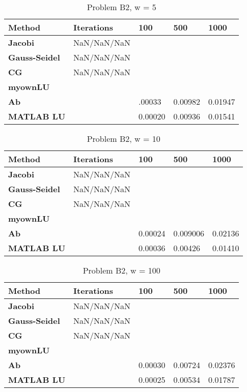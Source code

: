 \documentclass[a4paper]{article}
\begin{document}
\begin{table}[ht!]
\centering
\begin{tabular}{lllll}
\textbf{Method}& \textbf{Iterations}& \textbf{100}& \textbf{500}& \textbf{1000} \\ \hline
\textbf{Jacobi}& NaN/NaN/NaN& & & \\ 
\textbf{Gauss-Seidel}& NaN/NaN/NaN& & & \\
\textbf{CG}& NaN/NaN/NaN& & & \\
\textbf{myownLU}& & & & \\ 
\textbf{Ab}& & .00033& 0.00982& 0.01947\\
\textbf{MATLAB LU}& & 0.00020& 0.00936& 0.01541\\
 \hline

\end{tabular}
\caption{Problem B2, w = 5}
\label{tab:tab2}
\end{table}

\newpage
\begin{table}[ht!]
\centering
\begin{tabular}{lllll}
\textbf{Method}& \textbf{Iterations}& \textbf{100}& \textbf{500}& \textbf{1000} \\ \hline
\textbf{Jacobi}& NaN/NaN/NaN& & & \\ 
\textbf{Gauss-Seidel}& NaN/NaN/NaN& & & \\
\textbf{CG} & NaN/NaN/NaN& & &  \\
\textbf{myownLU}& & & & \\ 
\textbf{Ab}& & 0.00024& 0.009006& 0.02136\\
\textbf{MATLAB LU}& & 0.00036& 0.00426& 0.01410 \\
 \hline

\end{tabular}
\caption{Problem B2, w = 10}
\label{tab:tab3}
\end{table}


\begin{table}[ht!]
\centering
\begin{tabular}{lllll}
\textbf{Method}& \textbf{Iterations}& \textbf{100}& \textbf{500}& \textbf{1000} \\ \hline
\textbf{Jacobi}& NaN/NaN/NaN& & & \\ 
\textbf{Gauss-Seidel}& NaN/NaN/NaN& & & \\
\textbf{CG} & NaN/NaN/NaN& & &  \\
\textbf{myownLU} & & & & \\ 
\textbf{Ab}& & 0.00030& 0.00724& 0.02376\\
\textbf{MATLAB LU}& & 0.00025& 0.00534& 0.01787\\
 \hline

\end{tabular}
\caption{Problem B2, w = 100}
\label{tab:tab3}
\end{table}
\end{document}
